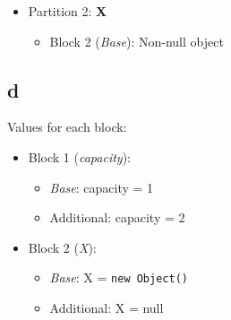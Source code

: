 \documentclass{article}
\begin{document}
\begin{latin}
\begin{itemize}
    \item Partition 2: \textbf{X}
    \begin{itemize}
        \item Block 2 (\textit{Base}): Non-null object
    \end{itemize}
\end{itemize}

\subsection{d}
Values for each block:
\begin{itemize}
    \item Block 1 (\textit{capacity}):
    \begin{itemize}
        \item \textit{Base}: capacity = 1
        \item Additional: capacity = 2
    \end{itemize}
    
    \item Block 2 (\textit{X}):
    \begin{itemize}
        \item \textit{Base}: X = \texttt{new Object()}
        \item Additional: X = null
    \end{itemize}
\end{itemize}
\end{latin}







\end{document}
